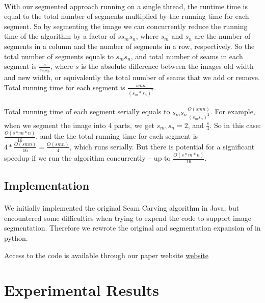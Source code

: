 \documentclass[conference]{acmsiggraph}
\begin{document}
\paragraph{}
With our segmented approach running on a single thread, the runtime time is equal to the total number of segments multiplied by the running time for each segment. So by segmenting the image we can concurrently reduce the running time of the algorithm by a factor of $s s_m s_n$, where $s_m$ and $s_n$ are the number of segments in a column and the number of segments in a row, respectively. So the total number of segments equals to $s_m s_n$, and total number of seams in each segment is $\frac{s}{s_m s_n} $, where $s$ is the absolute difference between the images old width and new width, or equivalently the total number of seams that we add or remove. Total running time for each segment is $ \frac{s m n}{(s_m*s_n)^2} $.


\paragraph{}
Total running time of each segment serially equals to $ s_m s_n   \frac{ O( s m n ) }{ ( s_m s_n)^2  }$. For example, when we segment the image into 4 parts, we get $s_m,s_n=2$, and $\frac{s}{4}$. So in this case: $\frac{O(s*m*n)}{16}$, and the the total running time for each segment is $4 * \frac{O (s m n)}{16} = \frac{O(s m n)}{4}$, which runs serially. But there is potential for a significant speedup if we run the algorithm concurrently -- up to $\frac{O(s*m*n)}{16}$.



\subsection{Implementation}

\paragraph{}
We initially implemented the original Seam Carving algorithm in Java, but encountered some difficulties when trying to expend the code to support image segmentation. Therefore we rewrote the original and segmentation expansion of in python. 

Access to the code is available through our paper website  \href{http://cs269uclawinter2014.wordpress.com/}{website}


\section{Experimental Results}
\end{document}
